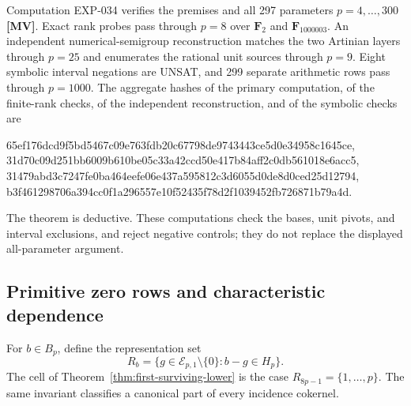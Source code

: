 \documentclass[11pt]{article}
\theoremstyle{definition}
\theoremstyle{remark}
\begin{document}
Computation EXP-034 verifies the premises and all 297 parameters \(p=4,\ldots,300\)
\textbf{[MV]}.
Exact rank probes pass through \(p=8\) over \(\mathbf F_2\) and \(\mathbf F_{1000003}\). An
independent numerical-semigroup reconstruction matches the two Artinian layers through \(p=25\)
and enumerates the rational unit sources through \(p=9\). Eight symbolic interval negations are
UNSAT, and 299 separate arithmetic rows pass through \(p=1000\). The aggregate hashes of the
primary computation, of the finite-rank checks, of the independent reconstruction, and of the
symbolic checks are
\begin{center}
{\fontsize{7}{8}\selectfont\ttfamily 65ef176dcd9f5bd5467c09e763fdb20c67798de9743443ce5d0e34958c1645ce},\\
{\fontsize{7}{8}\selectfont\ttfamily 31d70c09d251bb6009b610be05c33a42ccd50e417b84aff2c0db561018e6acc5},\\
{\fontsize{7}{8}\selectfont\ttfamily 31479abd3c7247fe0ba464eefe06e437a595812c3d6055d0de8d0ced25d12794},\\
{\fontsize{7}{8}\selectfont\ttfamily b3f461298706a394cc0f1a296557e10f52435f78d2f1039452fb726871b79a4d}.
\end{center}
The theorem is deductive. These computations check the bases, unit pivots, and interval
exclusions, and reject negative controls; they do not replace the displayed all-parameter
argument.

\subsection{Primitive zero rows and characteristic dependence}

For $b\in B_p$, define the representation set
\begin{equation}
R_b=\{g\in\mathcal E_{p,1}\setminus\{0\}:b-g\in H_p\}.
\label{eq:representation-set}
\end{equation}
The cell of Theorem~\ref{thm:first-surviving-lower} is the case $R_{8p-1}=\{1,\ldots,p\}$. The
same invariant classifies a canonical part of every incidence cokernel.
\end{document}
